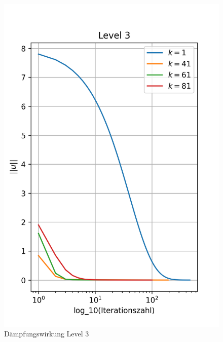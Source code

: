 \documentclass[11pt,a4paper]{article}
\begin{document}
\begin{figure}[htbp]
    \centering
    \begin{minipage}{0.45\linewidth}
        \centering
        \includegraphics[width= \linewidth,scale=0.7]{h1_level3}
        \caption[Level 3]{Dämpfungswirkung Level 3}\label{fig:h1_level3}
    \end{minipage}
     \hspace{0.5cm}
    \begin{minipage}{0.45\linewidth}

\end{minipage}
\end{figure}
\end{document}
